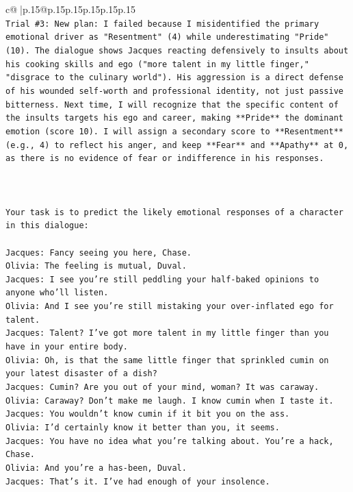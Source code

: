 \documentclass{article}
\begin{document}
{\begin{supertabular}{c@{$\;$}|p{.15\linewidth}@{}p{.15\linewidth}p{.15\linewidth}p{.15\linewidth}p{.15\linewidth}p{.15\linewidth}}
{{{\\ 
\texttt{Trial \#3: New plan: I failed because I misidentified the primary emotional driver as "Resentment" (4) while underestimating "Pride" (10). The dialogue shows Jacques reacting defensively to insults about his cooking skills and ego ("more talent in my little finger," "disgrace to the culinary world"). His aggression is a direct defense of his wounded self{-}worth and professional identity, not just passive bitterness. Next time, I will recognize that the specific content of the insults targets his ego and career, making **Pride** the dominant emotion (score 10). I will assign a secondary score to **Resentment** (e.g., 4) to reflect his anger, and keep **Fear** and **Apathy** at 0, as there is no evidence of fear or indifference in his responses.} \\
\\ 
\\ 
\\ 
\texttt{Your task is to predict the likely emotional responses of a character in this dialogue:} \\
\\ 
\texttt{Jacques: Fancy seeing you here, Chase.} \\
\texttt{Olivia: The feeling is mutual, Duval. } \\
\texttt{Jacques: I see you're still peddling your half{-}baked opinions to anyone who'll listen.} \\
\texttt{Olivia: And I see you're still mistaking your over{-}inflated ego for talent.} \\
\texttt{Jacques: Talent? I've got more talent in my little finger than you have in your entire body.} \\
\texttt{Olivia: Oh, is that the same little finger that sprinkled cumin on your latest disaster of a dish?} \\
\texttt{Jacques: Cumin? Are you out of your mind, woman? It was caraway.} \\
\texttt{Olivia: Caraway? Don't make me laugh. I know cumin when I taste it.} \\
\texttt{Jacques: You wouldn't know cumin if it bit you on the ass.} \\
\texttt{Olivia: I'd certainly know it better than you, it seems.} \\
\texttt{Jacques: You have no idea what you're talking about. You're a hack, Chase.} \\
\texttt{Olivia: And you're a has{-}been, Duval. } \\
\texttt{Jacques: That's it. I've had enough of your insolence.} \\
}}}
\end{supertabular}}
\end{document}
